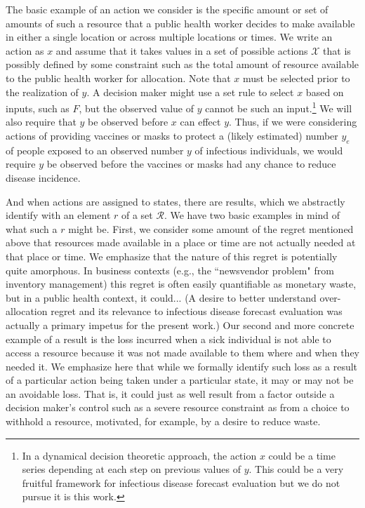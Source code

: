 \documentclass{article}
\begin{document}
The basic example of an action we consider is the specific amount or set of amounts of such a resource that a public health worker decides to make available in either a single location or across multiple locations or times.  We write an action as $x$ and assume that it takes values in a set of possible actions $\mathcal{X}$ that is possibly defined by some constraint such as the total amount of resource available to the public health worker for allocation.  Note that $x$ must be selected prior to the realization of $y$.  A decision maker might use a set rule to select $x$ based on inputs, such as $F$, but the observed value of $y$ cannot be such an input.\footnote{In a dynamical decision theoretic approach, the action $x$ could be a time series depending at each step on previous values of $y$.  This could be a very fruitful framework for infectious disease forecast evaluation but we do not pursue it is this work.} We will also require that $y$ be observed before $x$ can effect $y$.  Thus, if we were considering actions of providing vaccines or masks to protect a (likely estimated) number $y_e$ of people exposed to an observed number $y$ of infectious individuals, we would require $y$ be observed before the vaccines or masks had any chance to reduce disease incidence. 

And when actions are assigned to states, there are results, which we abstractly identify with an element $r$ of a set $\mathcal{R}$. We have two basic examples in mind of what such a $r$ might be.   First, we consider some amount of the regret mentioned above that resources made available in a place or time are not actually needed at that place or time. We emphasize that the nature of this regret is potentially quite amorphous.  In business contexts (e.g., the ``newsvendor problem" from inventory management) this regret is often easily quantifiable as monetary waste, but in a public health context, it could... (A desire to better understand over-allocation regret and its relevance to infectious disease forecast evaluation was actually a primary impetus for the present work.) 
Our second and more concrete example of a result is the loss incurred when a sick individual is not able to access a resource because it was not made available to them where and when they needed it.   We emphasize here that while we formally identify such loss as a result of a particular action being taken under a particular state, it may or may not be an avoidable loss.  That is, it could just as well result from a factor outside a decision maker's control such as a severe resource constraint as from a choice to withhold a resource, motivated, for example, by a desire to reduce waste.
\end{document}
